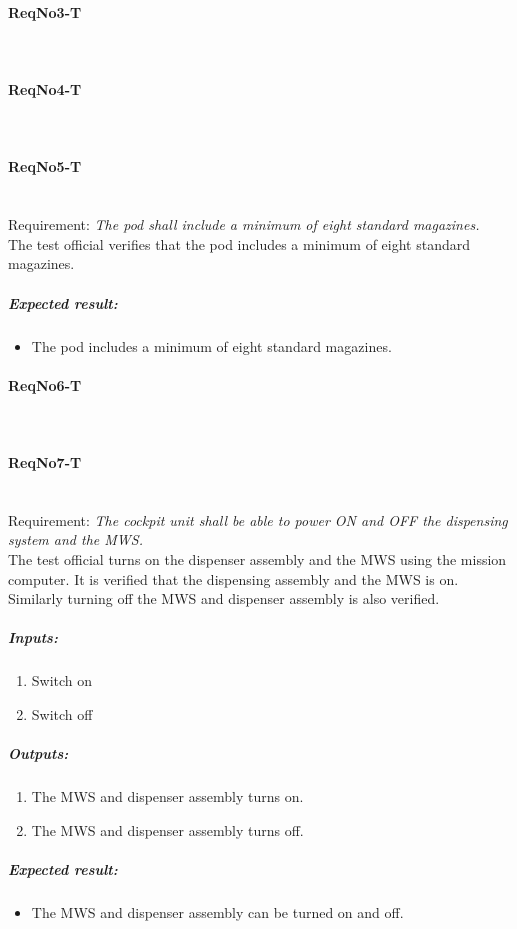 \paragraph{ReqNo3-T}\mbox{}\\ %


\paragraph{ReqNo4-T}\mbox{}\\ %

\paragraph{ReqNo5-T}\mbox{}\\ %
Requirement: \textit{The pod shall include a minimum of eight standard magazines.}\\

The test official verifies that the pod includes a minimum of eight standard magazines.

\subparagraph{Expected result:}
	\begin{itemize}
	\item The pod includes a minimum of eight standard magazines.
	\end{itemize}

\paragraph{ReqNo6-T}\mbox{}\\ %

\paragraph{ReqNo7-T}\mbox{}\\ %
Requirement: \textit{The cockpit unit shall be able to power ON and OFF the dispensing system and the MWS.}\\
The test official turns on the dispenser assembly and the MWS using the mission computer. It is verified that the dispensing assembly and the MWS is on. Similarly turning off the MWS and dispenser assembly is also verified.

\subparagraph{Inputs:}
	\begin{enumerate}
	\item Switch on
	\item Switch off
	\end{enumerate}
	\subparagraph{Outputs:}
	\begin{enumerate}
	\item The MWS and dispenser assembly turns on.
	\item The MWS and dispenser assembly turns off.
	\end{enumerate}
	\subparagraph{Expected result:}
	\begin{itemize}
	\item The MWS and dispenser assembly can be turned on and off.
	\end{itemize}


